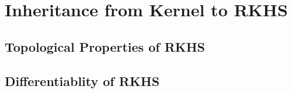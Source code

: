 \documentclass[a4paper,12pt]{article}
\begin{document}
\section{Inheritance from Kernel to RKHS}
\subsection{Topological Properties of RKHS}
\subsection{Differentiablity of RKHS}
\end{document}
